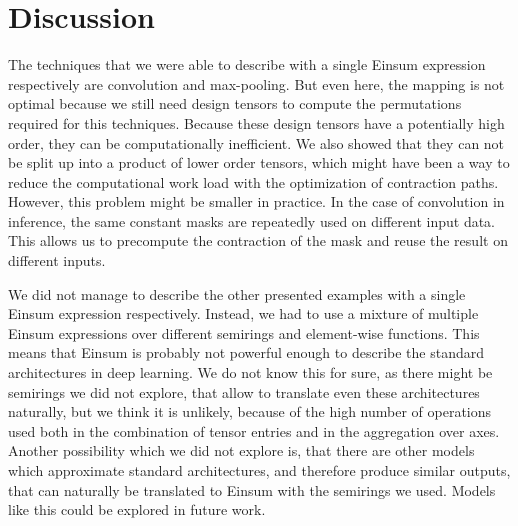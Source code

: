 \section{Discussion}

The techniques that we were able to describe with a single Einsum expression respectively are convolution and max-pooling.
But even here, the mapping is not optimal because we still need design tensors to compute the permutations required for this techniques.
Because these design tensors have a potentially high order, they can be computationally inefficient.
We also showed that they can not be split up into a product of lower order tensors, which might have been a way to reduce the computational work load with the optimization of contraction paths.
However, this problem might be smaller in practice.
In the case of convolution in inference, the same constant masks are repeatedly used on different input data.
This allows us to precompute the contraction of the mask and reuse the result on different inputs.

We did not manage to describe the other presented examples with a single Einsum expression respectively.
Instead, we had to use a mixture of multiple Einsum expressions over different semirings and element-wise functions.
This means that Einsum is probably not powerful enough to describe the standard architectures in deep learning.
We do not know this for sure, as there might be semirings we did not explore, that allow to translate even these architectures naturally,
but we think it is unlikely, because of the high number of operations used both in the combination of tensor entries and in the aggregation over axes.
Another possibility which we did not explore is, that there are other models which approximate standard architectures, and therefore produce similar outputs, that can naturally be translated to Einsum with the semirings we used.
Models like this could be explored in future work.
